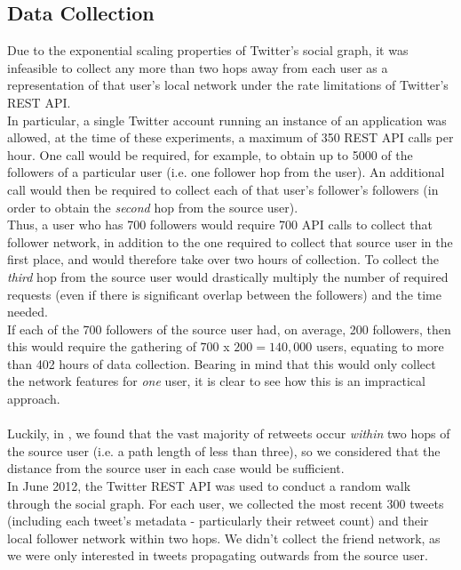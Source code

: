 \subsection{Data Collection}
Due to the exponential scaling properties of Twitter's social graph, it was infeasible to collect any more than two hops away from each user as a representation of that user's local network under the rate limitations of Twitter's REST API. 
\\
In particular, a single Twitter account running an instance of an application was allowed, at the time of these experiments, a maximum of 350 REST API calls per hour. One call would be required, for example, to obtain up to 5000 of the followers of a particular user (i.e. one follower hop from the user). An additional call would then be required to collect each of that user's follower's followers (in order to obtain the \emph{second} hop from the source user). \\
Thus, a user who has 700 followers would require 700 API calls to collect that follower network, in addition to the one required to collect that source user in the first place, and would therefore take over two hours of collection. To collect the \emph{third} hop from the source user would drastically multiply the number of required requests (even if there is significant overlap between the followers) and the time needed. 
\\
If each of the 700 followers of the source user had, on average, 200 followers, then this would require the gathering of $ 700 $ x $200 = 140,000 $ users, equating to more than 402 hours of data collection. Bearing in mind that this would only collect the network features for \emph{one} user, it is clear to see how this is an impractical approach.
\\ \\
Luckily, in \cite{webberley11}, we found that the vast majority of retweets occur \textit{within} two hops of the source user (i.e. a path length of less than three), so we considered that the distance from the source user in each case would be sufficient.
\\
In June 2012, the Twitter REST API was used to conduct a random walk through the social graph. For each user, we collected the most recent 300 tweets (including each tweet's metadata - particularly their retweet count) and their local follower network within two hops. We didn't collect the friend network, as we were only interested in tweets propagating outwards from the source user.
\\
